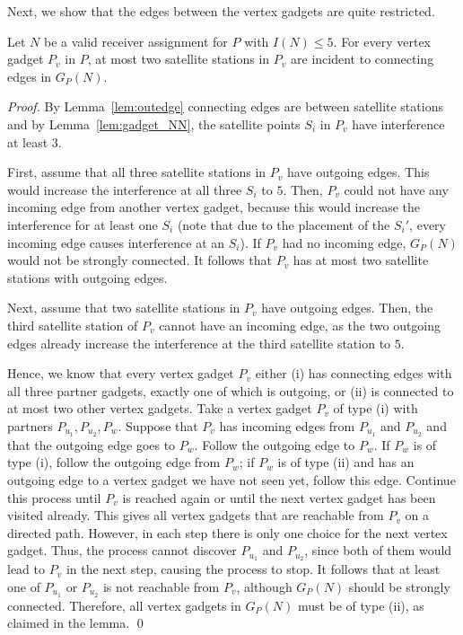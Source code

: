 \documentclass[envcountsect,envcountsame,runningheads,a4paper]{llncs}
\begin{document}
\noindent
Next, we show that the edges between the vertex gadgets are
quite restricted.

\begin{lemma}
\label{lem:inout}
Let $N$ be a valid receiver assignment for
$P$ with $I(N) \leq 5$.
For every vertex gadget $P_v$ in $P$,
at most two satellite stations in $P_v$
are incident to connecting edges in $G_P(N)$.
\end{lemma}

\begin{proof}
By Lemma~\ref{lem:outedge} connecting edges are between satellite stations and
by Lemma~\ref{lem:gadget_NN},
the satellite points $S_i$ in $P_v$ have
interference at least $3$.

First, assume that all three satellite
stations in $P_v$ have outgoing edges.
This would increase the interference
at all three $S_i$ to $5$. Then, $P_v$ could
not have any incoming edge from another vertex gadget,
because this would increase the interference for
at least one $S_i$ (note that due to the placement of
the $S_i'$, every incoming edge causes interference at
an $S_i$). If $P_v$ had no incoming edge, $G_P(N)$ would
not be strongly connected.
It follows that  $P_v$ has at most two satellite stations
with outgoing edges.

Next, assume that two satellite stations in
$P_v$ have outgoing edges. Then, the third satellite station
of $P_v$ cannot have an incoming edge,
as the two outgoing edges already increase the interference at the
third satellite station to $5$.

Hence, we know that every vertex gadget $P_v$ either
(i) has connecting edges with all three partner
gadgets, exactly one of which is outgoing,
or  (ii) is connected to
at most two other vertex gadgets. Take a vertex gadget $P_v$ of type (i)
with partners $P_{u_1}, P_{u_2}, P_w$.
Suppose that $P_v$ has incoming edges from $P_{u_1}$ and
$P_{u_2}$
and that the outgoing edge goes to $P_w$. Follow the outgoing edge to
$P_w$. If $P_w$ is of type (i), follow the outgoing
edge from $P_w$; if $P_w$ is of type (ii) and has an
outgoing edge to a vertex gadget we have not seen yet, follow this edge.
Continue this process until $P_v$ is reached again or until
the next vertex gadget has been visited already. This gives
all vertex gadgets that are reachable from $P_v$ on a
directed path.
However, in each step there is only one choice for the next
vertex gadget. Thus,
the process cannot discover $P_{u_1}$ and $P_{u_2}$, since both of them
would lead to $P_v$ in the next step, causing the process to stop.
It follows that at least one of $P_{u_1}$ or
$P_{u_2}$ is not reachable from $P_v$, although
$G_P(N)$ should be strongly connected. Therefore, all vertex gadgets in
$G_P(N)$ must be of type (ii), as claimed in the lemma.
\qed{}
\end{proof}
\end{document}
